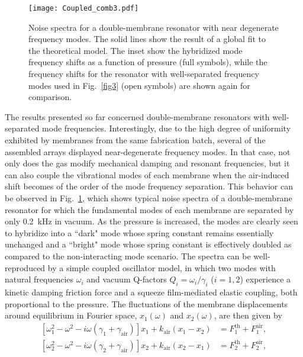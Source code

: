 \documentclass[pra,twocolumn,superscriptaddress,notitlepage]{revtex4-1}
\begin{document}
\begin{figure}
\texttt{[image: Coupled\_comb3.pdf]}
\caption{Noise spectra for a double-membrane resonator with near degenerate frequency modes. The solid lines show the result of a global fit to the theoretical model. The inset show the hybridized mode frequency shifts as a function of pressure (full symbols), while the frequency shifts for the resonator with well-separated frequency modes used in Fig.~\ref{fig3} (open symbols) are shown again for comparison.}
\label{fig4}
\end{figure}

The results presented so far concerned double-membrane resonators with well-separated mode frequencies. Interestingly, due to the high degree of uniformity exhibited by membranes from the same fabrication batch, several of the assembled arrays displayed near-degenerate frequency modes. In that case, not only does the gas modify mechanical damping and resonant frequencies, but it can also couple the vibrational modes of each membrane when the air-induced shift becomes of the order of the mode frequency separation. This behavior can be observed in Fig.~\ref{fig4}, which shows typical noise spectra of a double-membrane resonator for which the fundamental modes of each membrane are separated by only 0.2~kHz in vacuum. As the pressure is increased, the modes are clearly seen to hybridize into a ``dark" mode whose spring constant remains essentially unchanged and a ``bright" mode whose spring constant is effectively doubled as compared to the non-interacting mode scenario. The spectra can be well-reproduced by a simple coupled oscillator model, in which two modes with natural frequencies $\omega_i$ and vacuum Q-factors $Q_i=\omega_i/\gamma_i$ ($i=1,2$) experience a kinetic damping friction force and a squeeze film-mediated elastic coupling, both proportional to the pressure. The fluctuations of the membrane displacements around equilibrium in Fourier space, $x_1(\omega)$ and $x_2(\omega)$, are then given by
\begin{eqnarray}
\left[\omega_1^2-\omega^2-i\omega(\gamma_1+\gamma_{\textrm{air}})\right]x_1 +k_{\textrm{air}}(x_1-x_2) &=F^{\textrm{th}}_1+F^{\textrm{air}}_1,\\
\left[\omega_2^2-\omega^2-i\omega(\gamma_2+\gamma_{\textrm{air}})\right]x_2 +k_{\textrm{air}}(x_2-x_1)&=F^{\textrm{th}}_2+F^{\textrm{air}}_2,
\end{eqnarray}
\end{document}
